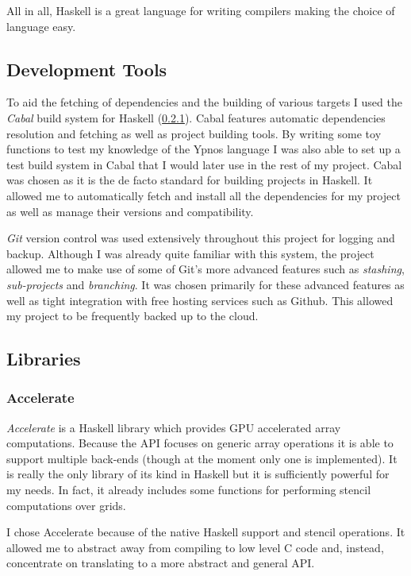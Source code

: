 \documentclass[12pt,a4paper,oneside]{scrbook}
\begin{document}
All in all, Haskell is a great language for writing compilers making the choice
of language easy.

\subsection{Development Tools}

To aid the fetching of dependencies and the building of various targets I
used the \emph{Cabal} build system for Haskell (\ref{}). Cabal features
automatic dependencies resolution and fetching as well as project building
tools. By writing some toy functions to test my knowledge of the Ypnos language
I was also able to set up a test build system in Cabal that I would later use in
the rest of my project. Cabal was chosen as it is the de facto standard for
building projects in Haskell. It allowed me to automatically fetch and install
all the dependencies for my project as well as manage their versions and
compatibility.

\emph{Git} version control was used extensively throughout this project for
logging and backup. Although I was already quite familiar with this system, the
project allowed me to make use of some of Git's more advanced features such as
\emph{stashing}, \emph{sub-projects} and \emph{branching}. It was chosen
primarily for these advanced features as well as tight integration with free
hosting services such as Github. This allowed my project to be frequently backed
up to the cloud.

\subsection{Libraries}

\subsubsection{Accelerate}

\emph{Accelerate} is a Haskell library which provides GPU accelerated array
computations. Because the API focuses on generic array operations it is able to
support multiple back-ends (though at the moment only one is implemented). It is
really the only library of its kind in Haskell but it is sufficiently powerful
for my needs. In fact, it already includes some functions for performing stencil
computations over grids.

I chose Accelerate because of the native Haskell support and stencil
operations. It allowed me to abstract away from compiling to low level C code
and, instead, concentrate on translating to a more abstract and general API.
\end{document}
